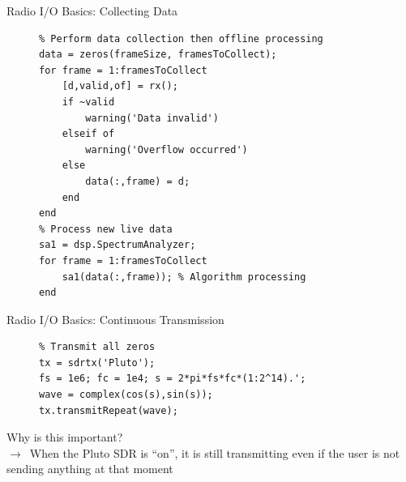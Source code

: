 \documentclass[10pt]{beamer}
\begin{document}

\begin{frame}[fragile]{Radio I/O Basics: Collecting Data}

\begin{figure}
\centering
\begin{minipage}[framed]{0.9\textwidth}
\begin{lstlisting}
% Perform data collection then offline processing
data = zeros(frameSize, framesToCollect);
for frame = 1:framesToCollect  
    [d,valid,of] = rx();
    if ~valid
        warning('Data invalid')
    elseif of
        warning('Overflow occurred')
    else
        data(:,frame) = d;
    end
end
% Process new live data
sa1 = dsp.SpectrumAnalyzer;
for frame = 1:framesToCollect
    sa1(data(:,frame)); % Algorithm processing
end
\end{lstlisting}
\end{minipage}
\captionsetup{labelformat=empty}
\end{figure}

 
\end{frame}




\begin{frame}[fragile]{Radio I/O Basics: Continuous Transmission}

\begin{figure}
\centering
\begin{minipage}[framed]{0.9\textwidth}
\begin{lstlisting}
% Transmit all zeros
tx = sdrtx('Pluto');
fs = 1e6; fc = 1e4; s = 2*pi*fs*fc*(1:2^14).';
wave = complex(cos(s),sin(s));
tx.transmitRepeat(wave);
\end{lstlisting}
\end{minipage}
\captionsetup{labelformat=empty}
\end{figure}
\vspace*{3mm}
Why is this important?\\
$\rightarrow$~When the Pluto SDR is ``on'', it is still transmitting even if the user is not sending anything at that moment

 
\end{frame}

\end{document}
